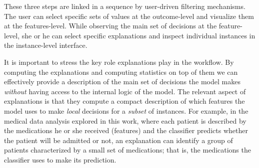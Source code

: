 
These three steps are linked in a sequence by user-driven filtering mechanisms. The user can select specific sets of values at the outcome-level and visualize them at the features-level. While observing the main set of decisions at the feature-level, she or he can select specific explanations and inspect individual instances in the instance-level interface.


It is important to stress the key role explanations play in the workflow. By computing the explanations and computing statistics on top of them we can effectively provide a description of the main set of decisions the model makes \textit{without} having access to the internal logic of the model. The relevant aspect of explanations is that they compute a compact description of which features the model uses to make \textit{local} decisions for a \textit{subset} of instances. 
For example, in the medical data analysis explored in this work, where each patient is described by the medications he or she received (features) and the classifier predicts whether the patient will be admitted or not, an explanation can identify a group of patients characterized by a small set of medications; that is, the medications the classifier uses to make its prediction.






